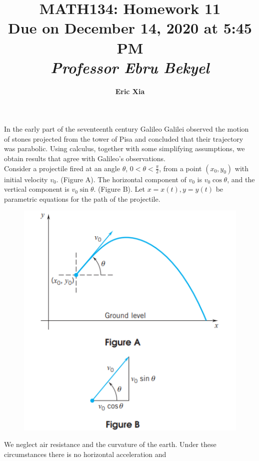 \documentclass{article}
\title{
    \vspace{2in}
    \textmd{\textbf{MATH134: Homework 11}}\\
    \normalsize\vspace{0.1in}\small{Due on December 14, 2020 at 5:45 PM}\\
    \vspace{0.1in}\large{\textit{Professor Ebru Bekyel}}
    \vspace{3in}
}
\author{\textbf{Eric Xia}}
\date{}
\begin{document}
    \maketitle
    \pagebreak

    \thispagestyle{2}

    In the early part of the seventeenth century Galileo Galilei observed the motion of stones projected from the tower of Pisa and
    concluded that their trajectory was parabolic. Using calculus,
    together with some simplifying assumptions, we obtain results
    that agree with Galileo’s observations. \\

    Consider a projectile fired at an angle $\theta$, $0 < \theta < \frac{\pi}{2}$, from a point $\left(x_0, y_0\right)$ with initial velocity $v_0$. (Figure A). The horizontal component of $v_0$ is $v_0\cos{\theta}$,
    and the vertical component is $v_0 \sin{\theta}$. (Figure B). Let $x=x(t),y=y(t)$ be parametric equations for the path of the projectile. 
    
    \begin{figure}[hbt!]
        \centering
        \includegraphics[scale=0.75]{Homework11_Fig1}
    \end{figure}

    We neglect air resistance and the curvature of the earth. Under these circumstances there is no horizontal acceleration and
\end{document}
